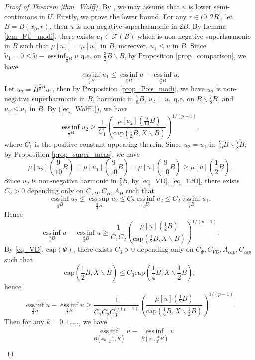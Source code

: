 \documentclass[11pt,a4paper]{article}
\numberwithin{equation}{section}
\newcommand{\esup}{\operatorname*{ess\,sup}}
\newcommand{\einf}{\operatorname*{ess\,inf}}
\theoremstyle{plain}
\theoremstyle{definition}
\begin{document}
\begin{proof}[Proof of Theorem \ref{thm_Wolff}]
By \hyperlink{eq_LSC}{}, we may assume that $u$ is lower semi-continuous in $U$. Firstly, we prove the lower bound. For any $r\in(0,2R]$, let $B=B(x_0,r)$, then $u$ is non-negative superharmonic in $2B$. By Lemma \ref{lem_FU_modi}, there exists $u_1\in \mathcal{F}(B)$ which is non-negative superharmonic in $B$ such that $\mu[u_1]=\mu[u]$ in $B$, moreover, $u_1\le u$ in $B$. Since $\widetilde{u}_1=0\le \widetilde{u}-\einf_{\frac{3}{2}B}u$ q.e. on $\frac{3}{2}B\backslash B$, by Proposition \ref{prop_comparison}, we have
$$\einf_{\frac{3}{4}B}u_1\le \einf_{\frac{3}{4}B}u-\einf_{\frac{3}{2}B}u.$$
Let $u_2=H^{\frac{7}{8}B}u_1$, then by Proposition \ref{prop_Pois_modi}, we have $u_2$ is non-negative superharmonic in $B$, harmonic in $\frac{7}{8}B$, $\widetilde{u}_2=\widetilde{u}_1$ q.e. on $B\backslash \frac{7}{8}B$, and $u_2\le u_1$ in $B$. By (\ref{eq_Wolff1}), we have
$$\einf_{\frac{1}{2}B}u_2\ge \frac{1}{C_1}\left(\frac{\mu[u_2]\left(\frac{9}{10}B\right)}{\mathrm{cap}\left(\frac{1}{2}B,X\backslash B\right)}\right)^{1/(p-1)},$$
where $C_1$ is the positive constant appearing therein. Since $u_2=u_1$ in $\frac{9}{10}B\backslash \overline{\frac{7}{8}B}$, by Proposition \ref{prop_super_meas}, we have
$$\mu[u_2]\left(\frac{9}{10}B\right)=\mu[u_1]\left(\frac{9}{10}B\right)=\mu[u]\left(\frac{9}{10}B\right)\ge \mu[u]\left(\frac{1}{2}B\right).$$
Since $u_2$ is non-negative harmonic in $\frac{7}{8}B$, by \ref{eq_VD}, \ref{eq_EHI}, there exists $C_2>0$ depending only on $C_{VD}, C_H, A_H$ such that
$$\einf_{\frac{1}{2}B}u_2\le \esup_{\frac{3}{4}B}u_2\le C_2\einf_{\frac{3}{4}B}u_2\le C_2\einf_{\frac{3}{4}B}u_1.$$
Hence
$$\einf_{\frac{3}{4}B}u-\einf_{\frac{3}{2}B}u\ge \frac{1}{C_1C_2}\left(\frac{\mu[u]\left(\frac{1}{2}B\right)}{\mathrm{cap}\left(\frac{1}{2}B,X\backslash B\right)}\right)^{1/(p-1)}.$$
By \ref{eq_VD}, \hyperlink{eq_cap}{$\text{cap}(\Psi)$}, there exists $C_3>0$ depending only on $C_{\Psi}, C_{VD}, A_{cap}, C_{cap}$ such that
$${\mathrm{cap}\left(\frac{1}{2}B,X\backslash B\right)}\le C_3{\mathrm{cap}\left(\frac{1}{4}B,X\backslash \frac{1}{2}B\right)},$$
hence
$$\einf_{\frac{3}{4}B}u-\einf_{\frac{3}{2}B}u\ge\frac{1}{C_1C_2C_3^{1/(p-1)}}\left(\frac{\mu[u]\left(\frac{1}{2}B\right)}{\mathrm{cap}\left(\frac{1}{4}B,X\backslash \frac{1}{2}B\right)}\right)^{1/(p-1)}.$$
Then for any $k=0,1,\ldots$, we have
\begin{align*}
&\einf_{B(x_0,\frac{3}{2^{k+1}}R)}u-\einf_{B(x_0,\frac{3}{2^{k}}R)}u\\

\end{align*}
\end{proof}
\end{document}

